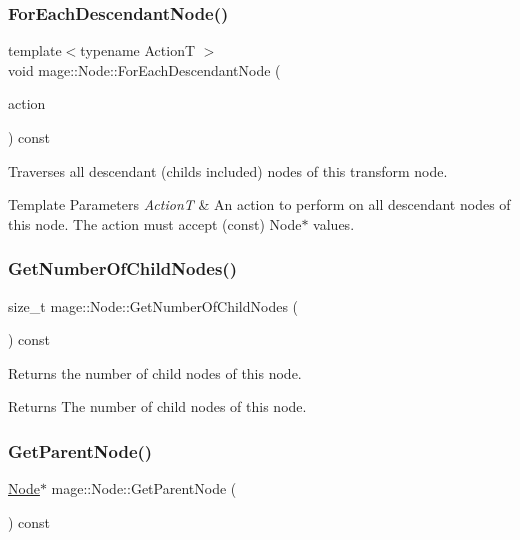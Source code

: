 \subsubsection{\texorpdfstring{For\+Each\+Descendant\+Node()}{ForEachDescendantNode()}}
{\footnotesize\ttfamily template$<$typename ActionT $>$ \\
void mage\+::\+Node\+::\+For\+Each\+Descendant\+Node (\begin{DoxyParamCaption}\item[{ActionT}]{action }\end{DoxyParamCaption}) const}

Traverses all descendant (childs included) nodes of this transform node.


\begin{DoxyTemplParams}{Template Parameters}
{\em ActionT} & An action to perform on all descendant nodes of this node. The action must accept ({\ttfamily const}) {\ttfamily Node$\ast$} values. \\
\hline
\end{DoxyTemplParams}
\hypertarget{classmage_1_1_node_ab4fff9779c09d873abcf881b6ff85d9e}{}\label{classmage_1_1_node_ab4fff9779c09d873abcf881b6ff85d9e} 
\subsubsection{\texorpdfstring{Get\+Number\+Of\+Child\+Nodes()}{GetNumberOfChildNodes()}}
{\footnotesize\ttfamily size\+\_\+t mage\+::\+Node\+::\+Get\+Number\+Of\+Child\+Nodes (\begin{DoxyParamCaption}{ }\end{DoxyParamCaption}) const\hspace{0.3cm}{\ttfamily [noexcept]}}

Returns the number of child nodes of this node.

\begin{DoxyReturn}{Returns}
The number of child nodes of this node. 
\end{DoxyReturn}
\hypertarget{classmage_1_1_node_a21ba704ed3af4c80d096ad5f393da8e0}{}\label{classmage_1_1_node_a21ba704ed3af4c80d096ad5f393da8e0} 
\subsubsection{\texorpdfstring{Get\+Parent\+Node()}{GetParentNode()}}
{\footnotesize\ttfamily \hyperlink{classmage_1_1_node}{Node}$\ast$ mage\+::\+Node\+::\+Get\+Parent\+Node (\begin{DoxyParamCaption}{ }\end{DoxyParamCaption}) const\hspace{0.3cm}{\ttfamily [noexcept]}}

